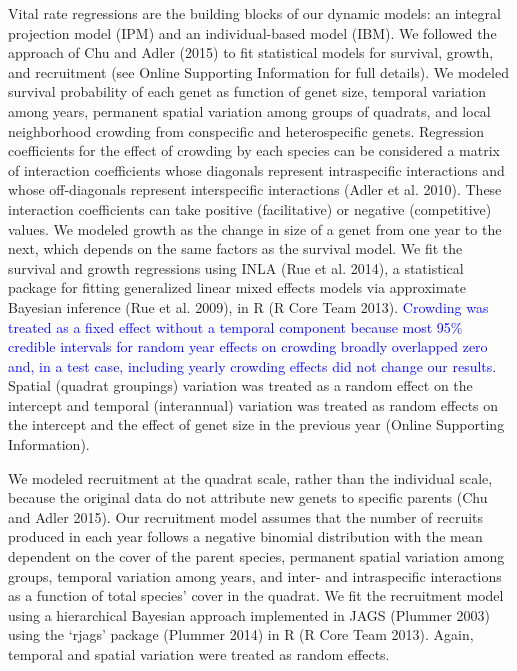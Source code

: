 \documentclass[12pt,]{article}
\begin{document}
Vital rate regressions are the building blocks of our dynamic models: an
integral projection model (IPM) and an individual-based model (IBM). We
followed the approach of Chu and Adler (2015) to fit statistical models
for survival, growth, and recruitment (see Online Supporting Information
for full details). We modeled survival probability of each genet as
function of genet size, temporal variation among years, permanent
spatial variation among groups of quadrats, and local neighborhood
crowding from conspecific and heterospecific genets. Regression
coefficients for the effect of crowding by each species can be
considered a matrix of interaction coefficients whose diagonals
represent intraspecific interactions and whose off-diagonals represent
interspecific interactions (Adler et al. 2010). These interaction
coefficients can take positive (facilitative) or negative (competitive)
values. We modeled growth as the change in size of a genet from one year
to the next, which depends on the same factors as the survival model. We
fit the survival and growth regressions using INLA (Rue et al. 2014), a
statistical package for fitting generalized linear mixed effects models
via approximate Bayesian inference (Rue et al. 2009), in R (R Core Team
2013).
\textcolor{blue}{Crowding was treated as a fixed effect without a temporal component because most 95\% credible intervals for random year effects on crowding broadly overlapped zero and, in a test case, including yearly crowding effects did not change our results.}
Spatial (quadrat groupings) variation was treated as a random effect on
the intercept and temporal (interannual) variation was treated as random
effects on the intercept and the effect of genet size in the previous
year (Online Supporting Information).

We modeled recruitment at the quadrat scale, rather than the individual
scale, because the original data do not attribute new genets to specific
parents (Chu and Adler 2015). Our recruitment model assumes that the
number of recruits produced in each year follows a negative binomial
distribution with the mean dependent on the cover of the parent species,
permanent spatial variation among groups, temporal variation among
years, and inter- and intraspecific interactions as a function of total
species' cover in the quadrat. We fit the recruitment model using a
hierarchical Bayesian approach implemented in JAGS (Plummer 2003) using
the `rjags' package (Plummer 2014) in R (R Core Team 2013). Again,
temporal and spatial variation were treated as random effects.
\end{document}

